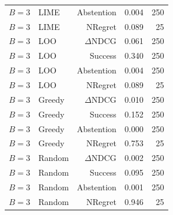 \begin{table}[t]
\begin{tabular}{llrrr}
$B=3$ & LIME & Abstention & 0.004 & 250 \\
$B=3$ & LIME & NRegret & 0.089 & 25 \\
$B=3$ & LOO & $\Delta$NDCG & 0.061 & 250 \\
$B=3$ & LOO & Success & 0.340 & 250 \\
$B=3$ & LOO & Abstention & 0.004 & 250 \\
$B=3$ & LOO & NRegret & 0.089 & 25 \\
$B=3$ & Greedy & $\Delta$NDCG & 0.010 & 250 \\
$B=3$ & Greedy & Success & 0.152 & 250 \\
$B=3$ & Greedy & Abstention & 0.000 & 250 \\
$B=3$ & Greedy & NRegret & 0.753 & 25 \\
$B=3$ & Random & $\Delta$NDCG & 0.002 & 250 \\
$B=3$ & Random & Success & 0.095 & 250 \\
$B=3$ & Random & Abstention & 0.001 & 250 \\
$B=3$ & Random & NRegret & 0.946 & 25 \\
\bottomrule
\end{tabular}
\end{table}
